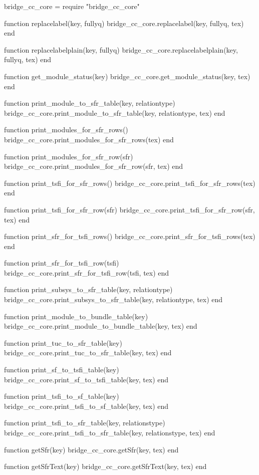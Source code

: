 \begin{luacode}

  bridge_cc_core = require "bridge_cc_core"

  function replacelabel(key, fullyq)
    bridge_cc_core.replacelabel(key, fullyq, tex)
  end

  function replacelabelplain(key, fullyq)
    bridge_cc_core.replacelabelplain(key, fullyq, tex)
  end

  function get_module_status(key)
    bridge_cc_core.get_module_status(key, tex)
  end

  function print_module_to_sfr_table(key, relationtype)
    bridge_cc_core.print_module_to_sfr_table(key, relationtype, tex)
  end

  function print_modules_for_sfr_rows()
    bridge_cc_core.print_modules_for_sfr_rows(tex)
  end

  function print_modules_for_sfr_row(sfr)
    bridge_cc_core.print_modules_for_sfr_row(sfr, tex)
  end

  function print_tsfi_for_sfr_rows()
    bridge_cc_core.print_tsfi_for_sfr_rows(tex)
  end

  function print_tsfi_for_sfr_row(sfr)
    bridge_cc_core.print_tsfi_for_sfr_row(sfr, tex)
  end

  function print_sfr_for_tsfi_rows()
    bridge_cc_core.print_sfr_for_tsfi_rows(tex)
  end

  function print_sfr_for_tsfi_row(tsfi)
    bridge_cc_core.print_sfr_for_tsfi_row(tsfi, tex)
  end

  function print_subsys_to_sfr_table(key, relationtype)
    bridge_cc_core.print_subsys_to_sfr_table(key, relationtype, tex)
  end

  function print_module_to_bundle_table(key)
    bridge_cc_core.print_module_to_bundle_table(key, tex)
  end

  function print_tuc_to_sfr_table(key)
    bridge_cc_core.print_tuc_to_sfr_table(key, tex)
  end

  function print_sf_to_tsfi_table(key)
    bridge_cc_core.print_sf_to_tsfi_table(key, tex)
  end

  function print_tsfi_to_sf_table(key)
    bridge_cc_core.print_tsfi_to_sf_table(key, tex)
  end

  function print_tsfi_to_sfr_table(key, relationstype)
    bridge_cc_core.print_tsfi_to_sfr_table(key, relationstype, tex)
  end

  function getSfr(key)
    bridge_cc_core.getSfr(key, tex)
  end

  function getSfrText(key)
    bridge_cc_core.getSfrText(key, tex)
  end


\end{luacode}
